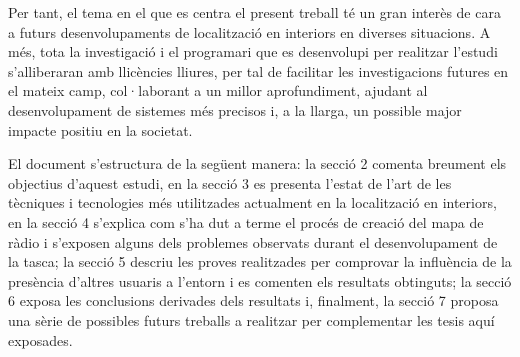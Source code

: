 Per tant, el tema en el que es centra el present treball té un gran interès de cara a futurs desenvolupaments de localització en interiors en diverses situacions. A més, tota la investigació i el programari que es desenvolupi per realitzar l’estudi s’alliberaran amb llicències lliures, per tal de facilitar les investigacions futures en el mateix camp, col·laborant a un millor aprofundiment, ajudant al desenvolupament de sistemes més precisos i, a la llarga, un possible major impacte positiu en la societat.

El document s'estructura de la següent manera: la secció 2 comenta breument els objectius d'aquest estudi, en la secció 3 es presenta l'estat de l'art de les tècniques i tecnologies més utilitzades actualment en la localització en interiors, en la secció 4 s'explica com s'ha dut a terme el procés de creació del mapa de ràdio i s'exposen alguns dels problemes observats durant el desenvolupament de la tasca; la secció 5 descriu les proves realitzades per comprovar la influència de la presència d'altres usuaris a l'entorn i es comenten els resultats obtinguts; la secció 6 exposa les conclusions derivades dels resultats i, finalment, la secció 7 proposa una sèrie de possibles futurs treballs a realitzar per complementar les tesis aquí exposades.
